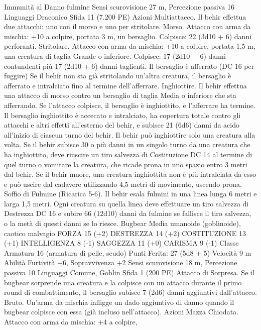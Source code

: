 \begin{multicols}{2}
Immunità al Danno fulmine
Sensi scurovisione 27 m, Percezione passiva 16
Linguaggi Draconico
Sfida 11 (7.200 PE)
Azioni
Multiattacco. Il behir effettua due attacchi: uno con il morso e
uno per stritolare.
Morso. Attacco con arma da mischia: +10 a colpire, portata 3 m,
un bersaglio.
Colpisce: 22 (3d10 + 6) danni perforanti.
Stritolare. Attacco con arma da mischia: +10 a colpire, portata
1,5 m, una creatura di taglia Grande o inferiore.
Colpisce: 17 (2d10 + 6) danni contundenti più 17 (2d10 + 6)
danni taglienti. Il bersaglio è afferrato (DC 16 per fuggire) Se il
behir non sta già stritolando un’altra creatura, il bersaglio è
afferrato e intralciato fino al termine dell’afferrare.
Inghiottire. Il behir effettua una attacco di morso contro un
bersaglio di taglia Media o inferiore che sta afferrando. Se
l’attacco colpisce, il bersaglio è inghiottito, e l’afferrare ha
termine. Il bersaglio inghiottito è accecato e intralciato, ha
copertura totale contro gli attacchi e altri effetti all’esterno del
behir, e subisce 21 (6d6) danni da acido all’inizio di ciascun
turno del behir. Il behir può inghiottire solo una creatura alla
volta.
Se il behir subisce 30 o più danni in un singolo turno da una
creatura che ha inghiottito, deve riuscire un tiro salvezza di
Costituzione DC 14 al termine di quel turno o vomitare la
creatura, che ricade prona in uno spazio entro 3 metri dal behir.
Se il behir muore, una creatura inghiottita non è più intralciata da
esso e può uscire dal cadavere utilizzando 4,5 metri di
movimento, uscendo prona.
Soffio di Fulmine (Ricarica 5-6). Il behir esala fulmini in una
linea lunga 6 metri e larga 1,5 metri. Ogni creatura su quella
linea deve effettuare un tiro salvezza di Destrezza DC 16 e subire
66 (12d10) danni da fulmine se fallisce il tiro salvezza, o la metà
di questi danni se lo riesce.
Bugbear
Media umanoide (goblinoide), caotico malvagio
FORZA 15 (+2)
DESTREZZA 14 (+2)
COSTITUZIONE 13 (+1)
INTELLIGENZA 8 (-1)
SAGGEZZA 11 (+0)
CARISMA 9 (-1)
Classe Armatura 16 (armatura di pelle, scudo)
\hspace*{0pt}\hfill{Punti Ferita}: 27 (5d8 + 5)
Velocità 9 m
Abilità Furtività +6, Sopravvivenza +2
Sensi scurovisione 18 m, Percezione passiva 10
Linguaggi Comune, Goblin
Sfida 1 (200 PE)
Attacco di Sorpresa. Se il bugbear sorprende una creatura e la
colpisce con un attacco durante il primo round di combattimento,
il bersaglio subisce 7 (2d6) danni aggiuntivi dall’attacco.
Bruto. Un’arma da mischia infligge un dado aggiuntivo di danno
quando il bugbear colpisce con essa (già incluso nell’attacco).
Azioni
Mazza Chiodata. Attacco con arma da mischia: +4 a colpire,

\end{multicols}

